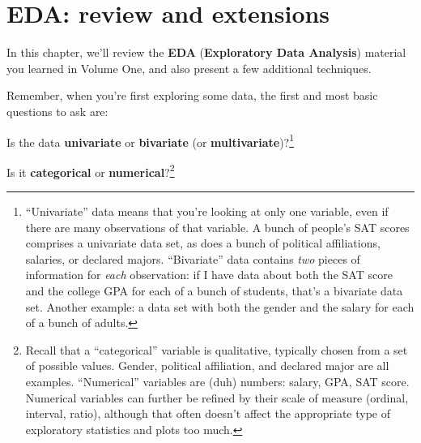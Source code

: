 \chapter{EDA: review and extensions}



In this chapter, we'll review the \textbf{EDA} (\textbf{Exploratory Data
Analysis}) material you learned in Volume One, and also present a few
additional techniques.

Remember, when you're first exploring some data, the first and most basic
questions to ask are:

\begin{compactenum}

\item Is the data \textbf{univariate} or \textbf{bivariate} (or
\textbf{multivariate})?\footnote{``Univariate'' data means that you're looking
at only one variable, even if there are many observations of that variable. A
bunch of people's SAT scores comprises a univariate data set, as does a bunch
of political affiliations, salaries, or declared majors. ``Bivariate'' data
contains \textit{two} pieces of information for \textit{each} observation: if I
have data about both the SAT score and the college GPA for each of a bunch of
students, that's a bivariate data set. Another example: a data set with both
the gender and the salary for each of a bunch of adults.}

\item Is it \textbf{categorical} or \textbf{numerical}?\footnote{Recall that a
``categorical'' variable is qualitative, typically chosen from a set of
possible values. Gender, political affiliation, and declared major are all
examples. ``Numerical'' variables are (duh) numbers: salary, GPA, SAT score.
Numerical variables can further be refined by their scale of measure (ordinal,
interval, ratio), although that often doesn't affect the appropriate type of
exploratory statistics and plots too much.}

\end{compactenum}

